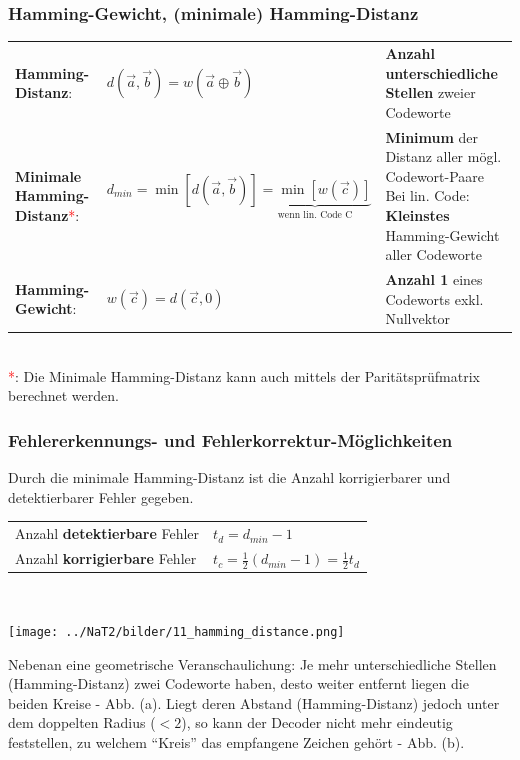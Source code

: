 \subsubsection{Hamming-Gewicht, (minimale) Hamming-Distanz}
\renewcommand{\arraystretch}{1.4}
\begin{tabular}[c]{ p{5.0cm}  p{5.0cm} p{9cm} }
	\textbf{Hamming-Distanz}:
	& $d(\vec{a},\vec{b}) = w(\vec{a} \oplus \vec{b})$
	& \textbf{Anzahl unterschiedliche Stellen} zweier Codeworte \\
	\textbf{Minimale Hamming-Distanz}\textcolor{red}{*}:
	& $d_{min} = \min[d(\vec{a},\vec{b})] \underbrace{= \min{[w(\vec{c})]}}_{\text{wenn lin. Code C}}$
	& \parbox[c]{9cm}{\textbf{Minimum} der Distanz aller mögl. Codewort-Paare\\
	Bei lin. Code: \textbf{Kleinstes} Hamming-Gewicht aller Codeworte} \\
	\textbf{Hamming-Gewicht}: 
	& $w(\vec{c}) = d(\vec{c},0)$
	& \textbf{Anzahl 1} eines Codeworts exkl. Nullvektor
\end{tabular}
\renewcommand{\arraystretch}{1} \\
\textcolor{red}{*}: Die Minimale Hamming-Distanz kann auch mittels der Paritätsprüfmatrix
 berechnet werden.


\subsubsection{Fehlererkennungs- und Fehlerkorrektur-Möglichkeiten}
Durch die minimale Hamming-Distanz ist die Anzahl korrigierbarer und detektierbarer Fehler
gegeben. \\
\renewcommand{\arraystretch}{1.4}
\begin{tabular}[c]{ p{5.5cm}  p{13cm} }
	Anzahl \textbf{detektierbare} Fehler & $t_d = d_{min} - 1$ \\
	Anzahl \textbf{korrigierbare} Fehler & $t_c = \frac12 (d_{min} - 1) = \frac12 t_d$
\end{tabular}
\renewcommand{\arraystretch}{1} \\

\begin{minipage}{7.5cm}
	\texttt{[image: ../NaT2/bilder/11\_hamming\_distance.png]}
\end{minipage}
\begin{minipage}{11.5cm}
	Nebenan eine geometrische Veranschaulichung: Je mehr unterschiedliche Stellen (Hamming-Distanz)
	zwei Codeworte haben, desto weiter entfernt liegen die beiden Kreise - Abb. (a). Liegt deren
	Abstand (Hamming-Distanz) jedoch unter dem doppelten Radius ($< 2$), so kann der Decoder nicht mehr
	eindeutig feststellen, zu welchem ``Kreis'' das empfangene Zeichen gehört - Abb. (b).
\end{minipage} 

